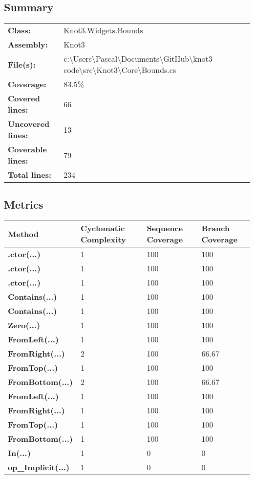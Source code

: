 \documentclass[a4paper,10pt]{article}
\begin{document}
\subsection{Summary}
\begin{longtable}[l]{ll}
\textbf{Class:} & Knot3.Widgets.Bounds\\
\textbf{Assembly:} & Knot3\\
\textbf{File(s):} & \begin{minipage}[t]{12cm}{c:\textbackslash Users\textbackslash Pascal\textbackslash Documents\textbackslash GitHub\textbackslash knot3-code\textbackslash src\textbackslash Knot3\textbackslash Core\textbackslash Bounds.cs}\end{minipage} \\
\textbf{Coverage:} & 83.5\%\\
\textbf{Covered lines:} & 66\\
\textbf{Uncovered lines:} & 13\\
\textbf{Coverable lines:} & 79\\
\textbf{Total lines:} & 234\\
\end{longtable}
\subsection{Metrics}
\begin{longtable}[l]{|l|l|l|l|}
\hline
\textbf{Method} & \textbf{Cyclomatic Complexity} & \textbf{Sequence Coverage} & \textbf{Branch Coverage}\\
\hline
\textbf{.ctor(...)} & 1 & 100 & 100\\
\hline
\textbf{.ctor(...)} & 1 & 100 & 100\\
\hline
\textbf{.ctor(...)} & 1 & 100 & 100\\
\hline
\textbf{Contains(...)} & 1 & 100 & 100\\
\hline
\textbf{Contains(...)} & 1 & 100 & 100\\
\hline
\textbf{Zero(...)} & 1 & 100 & 100\\
\hline
\textbf{FromLeft(...)} & 1 & 100 & 100\\
\hline
\textbf{FromRight(...)} & 2 & 100 & 66.67\\
\hline
\textbf{FromTop(...)} & 1 & 100 & 100\\
\hline
\textbf{FromBottom(...)} & 2 & 100 & 66.67\\
\hline
\textbf{FromLeft(...)} & 1 & 100 & 100\\
\hline
\textbf{FromRight(...)} & 1 & 100 & 100\\
\hline
\textbf{FromTop(...)} & 1 & 100 & 100\\
\hline
\textbf{FromBottom(...)} & 1 & 100 & 100\\
\hline
\textbf{In(...)} & 1 & 0 & 0\\
\hline
\textbf{op\_Implicit(...)} & 1 & 0 & 0\\
\hline
\end{longtable}
\end{document}
